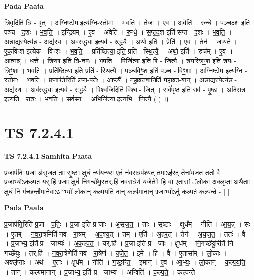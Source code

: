 \documentclass[17pt]{extarticle}
\begin{document}
\textbf{Pada Paata} \newline

त्रि॒वृदिति॑ त्रि - वृत् । अ॒ग्नि॒ष्टो॒म इत्य॑ग्नि-स्तो॒मः । भ॒व॒ति॒ । तेजः॑ । ए॒व । अवेति॑ । रु॒न्धे॒ । प॒ञ्च॒द॒श इति॑ पञ्च - द॒शः । भ॒व॒ति॒ । इ॒न्द्रि॒यम् । ए॒व । अवेति॑ । रु॒न्धे॒ । स॒प्त॒द॒श इति॑ सप्त - द॒शः । भ॒व॒ति॒ । अ॒न्नाद्य॒स्येत्य॑न्न - अद्य॑स्य । अव॑रुद्ध्या॒ इत्यव॑ - रु॒द्ध्यै॒ । अथो॒ इति॑ । प्रेति॑ । ए॒व । तेन॑ । जा॒य॒ते॒ । ए॒क॒विꣳ॒॒श इत्ये॑क - विꣳ॒॒शः । भ॒व॒ति॒ । प्रति॑ष्ठित्या॒ इति॒ प्रति॑ - स्थि॒त्यै॒ । अथो॒ इति॑ । रुच᳚म् । ए॒व । आ॒त्मन्न् । ध॒त्ते॒ । त्रि॒ण॒व इति॑ त्रि-न॒वः । भ॒व॒ति॒ । विजि॑त्या॒ इति॒ वि - जि॒त्यै॒ । त्र॒य॒स्त्रिꣳ॒॒श इति॑ त्रयः - त्रिꣳ॒॒शः । भ॒व॒ति॒ । प्रति॑ष्ठित्या॒ इति॒ प्रति॑ - स्थि॒त्यै॒ । प॒ञ्च॒विꣳ॒॒श इति॑ पञ्च - विꣳ॒॒शः । अ॒ग्नि॒ष्टो॒म इत्य॑ग्नि - स्तो॒मः । भ॒व॒ति॒ । प्र॒जाप॑ते॒रिति॑ प्र॒जा-प॒तेः॒ । आप्त्यै᳚ । म॒हा॒व्र॒तवा॒निति॑ महाव्र॒त-वा॒न् । अ॒न्नाद्य॒स्येत्य॑न्न - अद्य॑स्य । अव॑रुद्ध्या॒ इत्यव॑ - रु॒द्ध्यै॒ । वि॒श्व॒जिदिति॑ विश्व - जित् । सर्व॑पृष्ठ॒ इति॒ सर्व॑ - पृ॒ष्ठः॒ । अ॒ति॒रा॒त्र इत्य॑ति - रा॒त्रः । भ॒व॒ति॒ । सर्व॑स्य । अ॒भिजि॑त्या॒ इत्य॒भि - जि॒त्यै॒ ( ) ॥  \newline





\section{ TS 7.2.4.1 }

\textbf{TS 7.2.4.1 } \newline
\textbf{Samhita Paata} \newline

प्र॒जाप॑तिः प्र॒जा अ॑सृजत॒ ताः सृ॒ष्टाः क्षुधं॒ न्या॑य॒न्थ्स ए॒तं न॑वरा॒त्रप॑श्य॒त् तमाऽह॑र॒त् तेना॑यजत॒ ततो॒ वै प्र॒जाभ्यो॑ऽकल्पत॒ यर्.हि॑ प्र॒जाः क्षुधं॑ नि॒गच्छे॑यु॒स्तर्.हि॑ नवरा॒त्रेण॑ यजेते॒मे हि वा ए॒तासां᳚ ॅलो॒का अक्लृ॑प्ता॒ अथै॒ताः क्षुधं॒ नि ग॑च्छन्ती॒माने॒वाऽऽ*भ्यो॑ लो॒कान् क॑ल्पयति॒ तान् कल्प॑मानान् प्र॒जाभ्योऽनु॑ कल्पते॒ कल्प॑न्ते - [  ] \newline

\textbf{Pada Paata} \newline

प्र॒जाप॑ति॒रिति॑ प्र॒जा - प॒तिः॒ । प्र॒जा इति॑ प्र-जाः । अ॒सृ॒ज॒त॒ । ताः । सृ॒ष्टाः । क्षुध᳚म् । नीति॑ । आ॒य॒न्न् । सः । ए॒तम् । न॒व॒रा॒त्रमिति॑ नव - रा॒त्रम् । अ॒प॒श्य॒त् । तम् । एति॑ । अ॒ह॒र॒त् । तेन॑ । अ॒य॒ज॒त॒ । ततः॑ । वै । प्र॒जाभ्य॒ इति॑ प्र - जाभ्यः॑ । अ॒क॒ल्प॒त॒ । यर्.हि॑ । प्र॒जा इति॑ प्र - जाः । क्षुध᳚म् । नि॒गच्छे॑यु॒रिति॑ नि - गच्छे॑युः । तर्.हि॑ । न॒व॒रा॒त्रेणेति॑ नव - रा॒त्रेण॑ । य॒जे॒त॒ । इ॒मे । हि । वै । ए॒तासा᳚म् । लो॒काः । अक्लृ॑प्ताः । अथ॑ । ए॒ताः । क्षुध᳚म् । नीति॑ । ग॒च्छ॒न्ति॒ । इ॒मान् । ए॒व । आ॒भ्यः॒ । लो॒कान् । क॒ल्प॒य॒ति॒ । तान् । कल्प॑मानान् । प्र॒जाभ्य॒ इति॑ प्र - जाभ्यः॑ । अन्विति॑ । क॒ल्प॒ते॒ । कल्प॑न्ते ।  \newline
\end{document}
